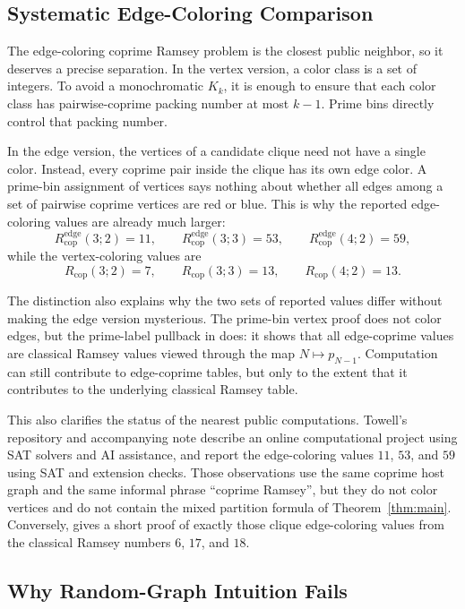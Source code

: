 \documentclass[11pt]{article}
\theoremstyle{plain}
\theoremstyle{definition}
\theoremstyle{remark}
\newcommand{\Rcop}{R_{\mathrm{cop}}}
\newcommand{\Redge}{R_{\mathrm{cop}}^{\mathrm{edge}}}
\begin{document}
\subsection{Systematic Edge-Coloring Comparison}
\label{app:edge-comparison}

The edge-coloring coprime Ramsey problem is the closest public neighbor, so
it deserves a precise separation.  In the vertex version, a color class is a
set of integers.  To avoid a monochromatic $K_k$, it is enough to ensure
that each color class has pairwise-coprime packing number at most $k-1$.
Prime bins directly control that packing number.

In the edge version, the vertices of a candidate clique need not have a
single color.  Instead, every coprime pair inside the clique has its own
edge color.  A prime-bin assignment of vertices says nothing about whether
all edges among a set of pairwise coprime vertices are red or blue.  This is
why the reported edge-coloring values are already much larger:
\[
  \Redge(3;2)=11,\qquad
  \Redge(3;3)=53,\qquad
  \Redge(4;2)=59,
\]
while the vertex-coloring values are
\[
  \Rcop(3;2)=7,\qquad
  \Rcop(3;3)=13,\qquad
  \Rcop(4;2)=13.
\]

The distinction also explains why the two sets of reported values differ
without making the edge version mysterious.  The prime-bin vertex proof does
not color edges, but the prime-label pullback in 
does: it shows that all edge-coprime values are classical Ramsey values
viewed through the map $N\mapsto p_{N-1}$.  Computation can still contribute
to edge-coprime tables, but only to the extent that it contributes to the
underlying classical Ramsey table.

This also clarifies the status of the nearest public computations.  Towell's
repository and accompanying note \cite{towell-blog,towell-github} describe an
online computational project using SAT solvers and AI assistance, and report
the edge-coloring values $11$, $53$, and $59$ using SAT and extension checks.
Those observations use
the same coprime host graph and the same informal phrase ``coprime Ramsey'',
but they do not color vertices and do not contain the mixed partition formula
of Theorem~\ref{thm:main}.  Conversely,  gives a
short proof of exactly those clique edge-coloring values from the classical
Ramsey numbers $6$, $17$, and $18$.

\subsection{Why Random-Graph Intuition Fails}
\label{app:randomness}
\end{document}
